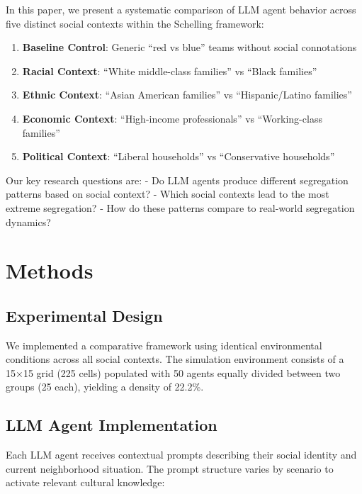 \documentclass[
  11pt,
]{article}
\providecommand{\tightlist}{%
  \setlength{\itemsep}{0pt}\setlength{\parskip}{0pt}}
\begin{document}
In this paper, we present a systematic comparison of LLM agent behavior
across five distinct social contexts within the Schelling framework:

\begin{enumerate}
\def\labelenumi{\arabic{enumi}.}
\tightlist
\item
  \textbf{Baseline Control}: Generic ``red vs blue'' teams without
  social connotations
\item
  \textbf{Racial Context}: ``White middle-class families'' vs ``Black
  families''\\
\item
  \textbf{Ethnic Context}: ``Asian American families'' vs
  ``Hispanic/Latino families''
\item
  \textbf{Economic Context}: ``High-income professionals'' vs
  ``Working-class families''
\item
  \textbf{Political Context}: ``Liberal households'' vs ``Conservative
  households''
\end{enumerate}

Our key research questions are: - Do LLM agents produce different
segregation patterns based on social context? - Which social contexts
lead to the most extreme segregation? - How do these patterns compare to
real-world segregation dynamics?

\section{Methods}\label{methods}

\subsection{Experimental Design}\label{experimental-design}

We implemented a comparative framework using identical environmental
conditions across all social contexts. The simulation environment
consists of a 15×15 grid (225 cells) populated with 50 agents equally
divided between two groups (25 each), yielding a density of 22.2\%.

\subsection{LLM Agent Implementation}\label{llm-agent-implementation}

Each LLM agent receives contextual prompts describing their social
identity and current neighborhood situation. The prompt structure varies
by scenario to activate relevant cultural knowledge:
\end{document}
